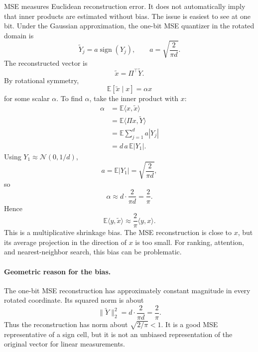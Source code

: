 MSE measures Euclidean reconstruction error.
It does not automatically imply that inner products are estimated without bias.
The issue is easiest to see at one bit.
Under the Gaussian approximation, the one-bit MSE quantizer in the rotated domain is
\begin{equation}
    \widetilde Y_j=a\operatorname{sign}(Y_j),
    \qquad
    a=\sqrt{\frac{2}{\pi d}}.
\end{equation}
The reconstructed vector is
\begin{equation}
    \widetilde x=\Pi^\top \widetilde Y.
\end{equation}
By rotational symmetry,
\begin{equation}
    \mathbb E[\widetilde x\mid x]=\alpha x
\end{equation}
for some scalar $\alpha$.
To find $\alpha$, take the inner product with $x$:
\begin{align}
    \alpha
    &=\mathbb E\langle x,\widetilde x\rangle\\
    &=\mathbb E\langle \Pi x,\widetilde Y\rangle\\
    &=\mathbb E\sum_{j=1}^{d} a|Y_j|\\
    &=d\,a\,\mathbb E|Y_1|.
\end{align}
Using $Y_1\approx\mathcal N(0,1/d)$,
\begin{equation}
    a=\mathbb E|Y_1|=\sqrt{\frac{2}{\pi d}},
\end{equation}
so
\begin{equation}
    \alpha\approx d\cdot \frac{2}{\pi d}=\frac{2}{\pi}.
\end{equation}
Hence
\begin{equation}
    \mathbb E\langle y,\widetilde x\rangle
    \approx
    \frac{2}{\pi}\langle y,x\rangle.
\end{equation}
This is a multiplicative shrinkage bias.
The MSE reconstruction is close to $x$, but its average projection in the direction of $x$ is too small.
For ranking, attention, and nearest-neighbor search, this bias can be problematic.

\paragraph{Geometric reason for the bias.}
The one-bit MSE reconstruction has approximately constant magnitude in every rotated coordinate.
Its squared norm is about
\begin{equation}
    \|\widetilde Y\|_2^2=d\cdot \frac{2}{\pi d}=\frac{2}{\pi}.
\end{equation}
Thus the reconstruction has norm about $\sqrt{2/\pi}<1$.
It is a good MSE representative of a sign cell, but it is not an unbiased representation of the original vector for linear measurements.

